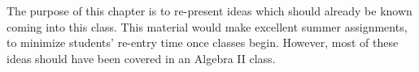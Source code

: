 


The purpose of this chapter is to re-present ideas which should already be known coming into
this class.  This material would make excellent summer assignments, to minimize students' 
re-entry time once classes begin.  However, most of these ideas should have been covered in
an Algebra II class.

\newpage
\chapterminitoc


\newpage

\newpage

\newpage

\newpage

\newpage

\newpage

\newpage

\newpage

